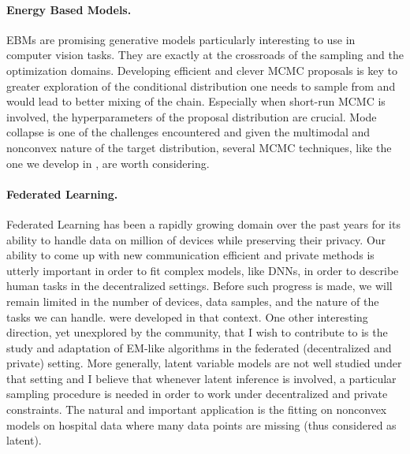 \documentclass[twoside,11pt]{article}
\begin{document}
\vspace{0.08in}
\paragraph{Energy Based Models.} 
EBMs are promising generative models particularly interesting to use in computer vision tasks.
They are exactly at the crossroads of the sampling and the optimization domains.
Developing efficient and clever MCMC proposals is key to greater exploration of the conditional distribution one needs to sample from and would lead to better mixing of the chain. 
Especially when short-run MCMC is involved, the hyperparameters of the proposal distribution are crucial.
Mode collapse is one of the challenges encountered and given the multimodal and nonconvex nature of the target distribution, several MCMC techniques, like the one we develop in \citep{karimi2020anila}, are worth considering.


\vspace{0.08in}
\paragraph{Federated Learning.} 
Federated Learning has been a rapidly growing domain over the past years for its ability to handle data on million of devices while preserving their privacy.
Our ability to come up with new communication efficient and private methods is utterly important in order to fit complex models, like DNNs, in order to describe human tasks in the decentralized settings.
Before such progress is made, we will remain limited in the number of devices, data samples, and the nature of the tasks we can handle.
\citep{had2020, karimi2020lars} were developed in that context.
One other interesting direction, yet unexplored by the community, that I wish to contribute to is the study and adaptation of EM-like algorithms in the federated (decentralized and private) setting.
More generally, latent variable models are not well studied under that setting and I believe that whenever latent inference is involved, a particular sampling procedure is needed in order to work under decentralized and private constraints.
The natural and important application is the fitting on nonconvex models on hospital data where many data points are missing (thus considered as latent).


\vspace{0.08in}
\end{document}
